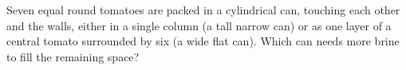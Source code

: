 Seven equal round tomatoes are packed in a cylindrical can, touching each other and the walls, either in a single column (a tall narrow can) or as one layer of a central tomato surrounded by six (a wide flat can). Which can needs more brine to fill the remaining space?
